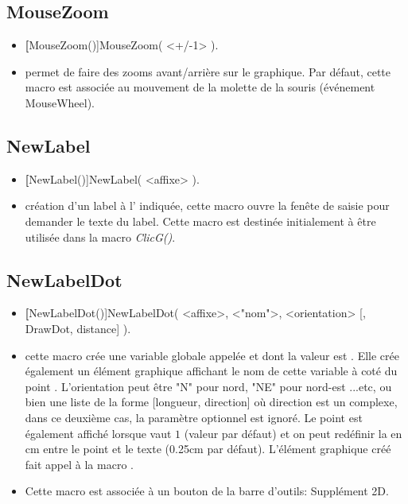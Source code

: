 \subsection{MouseZoom}

\begin{itemize}
 \item \util \textbf[MouseZoom()]{MouseZoom( <+/-1> )}.
 \item \desc permet de faire des zooms avant/arrière sur le graphique. Par défaut, cette macro est associée au mouvement de la molette de la souris (événement MouseWheel).
\end{itemize}


\subsection{NewLabel}

\begin{itemize}
 \item \util \textbf[NewLabel()]{NewLabel( <affixe> )}.
 \item \desc création d'un label à l' indiquée, cette macro ouvre la fenête de saisie pour demander le texte du label. Cette macro est destinée initialement à être utilisée dans la macro \textsl{ClicG()}.
\end{itemize}

\subsection{NewLabelDot}

\begin{itemize}
 \item \util \textbf[NewLabelDot()]{NewLabelDot( <affixe>, <"nom">, <orientation> [, DrawDot, distance] )}.
 \item \desc cette macro crée une variable globale appelée  et dont la valeur est . Elle crée également un élément graphique affichant le nom de cette variable à coté du point . L'orientation peut être "N" pour nord, "NE" pour nord-est ...etc, ou bien une liste de la forme [longueur, direction] où direction est un complexe, dans ce deuxième cas, la paramètre optionnel  est ignoré. Le point est également affiché lorsque  vaut $1$ (valeur par défaut) et on peut redéfinir la  en cm entre le point et le texte (0.25cm par défaut). L'élément graphique créé fait appel à la macro .
 \item Cette macro est associée à un bouton de la barre d'outils: Supplément 2D.
\end{itemize}

